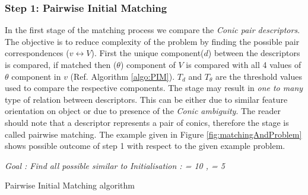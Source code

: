 \documentclass{bmvc2k}
\begin{document}
\subsubsection{Step 1: Pairwise Initial Matching}
\label{subsubSec:PIM}
In the first stage of the matching process we compare the \textit{Conic pair descriptors}.
The objective is to reduce complexity of the problem by finding the possible pair correspondences ($ v \leftrightarrow V $). 
First the unique component($ d $) between the descriptors is compared, if matched then ($ \theta $) component of $ V $ is compared with all 4 values of $ \theta $ component in $ v $ (Ref. Algorithm \ref{algo:PIM}). 
$ T_{d} $ and $ T_\theta $ are the threshold values used to compare the respective components. 
The stage may result in \textit{one to many} type of relation between descriptors. This can be either due to similar feature orientation on object or due to presence of the \textit{Conic ambiguity}. 
The reader should note that a descriptor represents a pair of conics, therefore the stage is called pairwise matching.
The example given in Figure \ref{fig:matchingAndProblem} shows possible outcome of step 1 with respect to the given example problem. 

\begin{algorithm}[h] \label{algo:PIM}
\emph{Goal : Find all possible \threeDFv similar to \twoDFv} \;
\emph{Initialisation : \ThresholdD = 10 , \ThresholdA = 5} \; 
\caption{Pairwise Initial Matching algorithm}
\end{algorithm}

\end{document}
